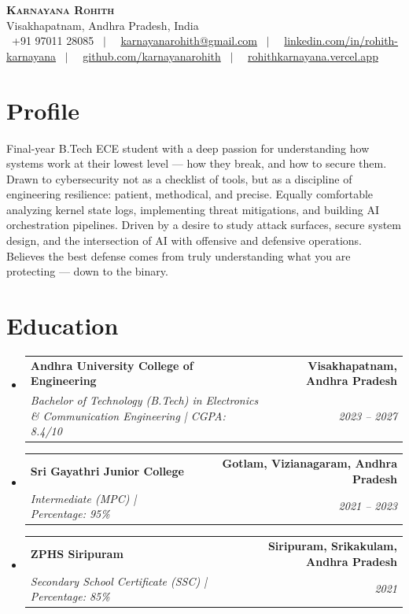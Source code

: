 \documentclass[letterpaper,10pt]{article}
\makeatletter
\newcommand{\resumeSubheading}[4]{
  \item
    \begin{tabular*}{1.0\textwidth}[t]{l@{\extracolsep{\fill}}r}
      \textbf{\color{darkblue}#1} & \textbf{\small #2} \\
      \textit{\small#3} & \textit{\small #4} \\
    \end{tabular*}\vspace{-4pt}
}
\newcommand{\resumeSubHeadingListStart}{\begin{itemize}[leftmargin=0.15in, label={}]}
\newcommand{\resumeSubHeadingListEnd}{\end{itemize}}
\makeatother
\begin{document}
\begin{center}
    \textbf{\huge \scshape Karnayana Rohith} \\ \vspace{4pt}
    \small Visakhapatnam, Andhra Pradesh, India \\ \vspace{3pt}
    \small
    \faPhone\ +91 97011 28085 \ $|$ \
    \faEnvelope\ \href{mailto:karnayanarohith@gmail.com}{karnayanarohith@gmail.com} \ $|$ \
    \faLinkedin\ \href{https://linkedin.com/in/rohith-karnayana}{linkedin.com/in/rohith-karnayana} \ $|$ \
    \faGithub\ \href{https://github.com/karnayanarohith}{github.com/karnayanarohith} \ $|$ \
    \faGlobe\ \href{https://rohithkarnayana.vercel.app}{rohithkarnayana.vercel.app}
\end{center}

\section{Profile}
\small{Final-year B.Tech ECE student with a deep passion for understanding how systems work at their lowest level — how they break, and how to secure them. Drawn to cybersecurity not as a checklist of tools, but as a discipline of engineering resilience: patient, methodical, and precise. Equally comfortable analyzing kernel state logs, implementing threat mitigations, and building AI orchestration pipelines. Driven by a desire to study attack surfaces, secure system design, and the intersection of AI with offensive and defensive operations. Believes the best defense comes from truly understanding what you are protecting — down to the binary.}

\section{Education}
\resumeSubHeadingListStart
    \resumeSubheading
      {Andhra University College of Engineering}{Visakhapatnam, Andhra Pradesh}
      {Bachelor of Technology (B.Tech) in Electronics \& Communication Engineering | CGPA: 8.4/10}{2023 -- 2027}
    \resumeSubheading
      {Sri Gayathri Junior College}{Gotlam, Vizianagaram, Andhra Pradesh}
      {Intermediate (MPC) | Percentage: 95\%}{2021 -- 2023}
    \resumeSubheading
      {ZPHS Siripuram}{Siripuram, Srikakulam, Andhra Pradesh}
      {Secondary School Certificate (SSC) | Percentage: 85\%}{2021}
\resumeSubHeadingListEnd
\end{document}
